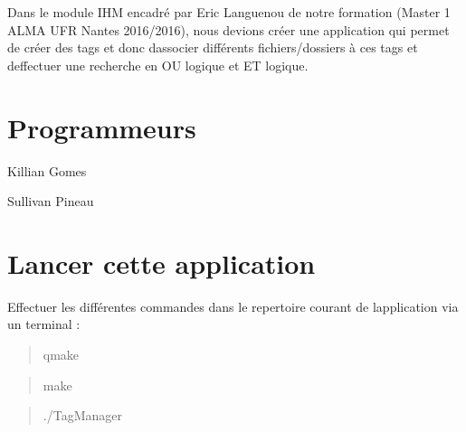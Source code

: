 Dans le module I\+HM encadré par Eric Languenou de notre formation (Master 1 A\+L\+MA U\+FR Nantes 2016/2016), nous devions créer une application qui permet de créer des tags et donc d\textquotesingle{}associer différents fichiers/dossiers à ces tags et d\textquotesingle{}effectuer une recherche en OU logique et ET logique.

\section*{Programmeurs}


\begin{DoxyItemize}
\item Killian Gomes
\item Sullivan Pineau
\end{DoxyItemize}

\section*{Lancer cette application}

Effectuer les différentes commandes dans le repertoire courant de l\textquotesingle{}application via un terminal \+:

\begin{quote}
qmake \end{quote}


\begin{quote}
make \end{quote}


\begin{quote}
./\+Tag\+Manager\end{quote}
